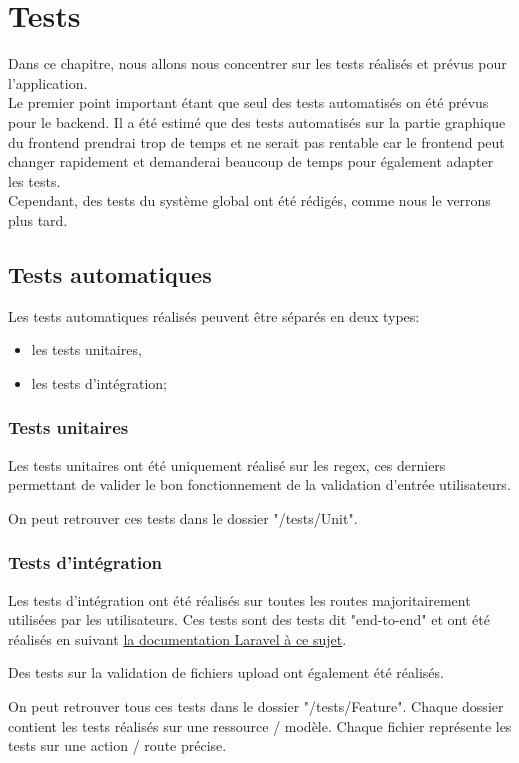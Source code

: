 \documentclass[
    iai, %
    il, %
]{heig-tb}
\begin{document}
\chapter{Tests}
Dans ce chapitre, nous allons nous concentrer sur les tests réalisés et prévus pour l'application. \\
Le premier point important étant que seul des tests automatisés on été prévus pour le \Gls{backend}. Il a été estimé que des tests automatisés sur la partie graphique du \Gls{frontend} prendrai trop de temps et ne serait pas rentable car le frontend peut changer rapidement et demanderai beaucoup de temps pour également adapter les tests. \\
Cependant, des tests du système global ont été rédigés, comme nous le verrons plus tard.

\section{Tests automatiques}

Les tests automatiques réalisés peuvent être séparés en deux types:
\begin{itemize}
    \item les tests unitaires,
    \item les tests d'intégration;
\end{itemize}

\subsection{Tests unitaires}
Les tests unitaires ont été uniquement réalisé sur les \Gls{regex}, ces derniers permettant de valider le bon fonctionnement de la validation d'entrée utilisateurs.

On peut retrouver ces tests dans le dossier "/tests/Unit".

\subsection{Tests d'intégration}
Les tests d'intégration ont été réalisés sur toutes les routes majoritairement utilisées par les utilisateurs. Ces tests sont des tests dit "end-to-end" et ont été réalisés en suivant \href{https://laravel.com/docs/9.x/http-tests}{la documentation Laravel à ce sujet}.

Des tests sur la validation de fichiers upload ont également été réalisés.

On peut retrouver tous ces tests dans le dossier "/tests/Feature". Chaque dossier contient les tests réalisés sur une ressource / modèle. Chaque fichier représente les tests sur une action / route précise.
\end{document}
